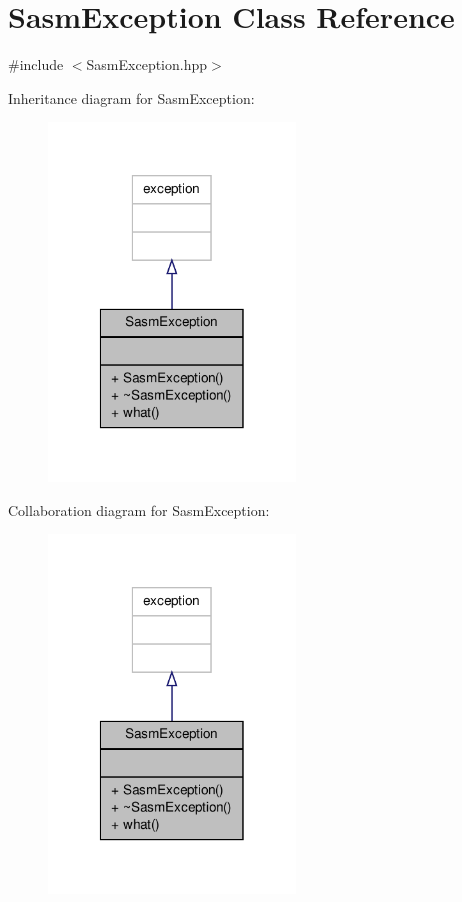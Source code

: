 \hypertarget{class_sasm_exception}{\section{Sasm\-Exception Class Reference}
\label{class_sasm_exception}
}


{\ttfamily \#include $<$Sasm\-Exception.\-hpp$>$}



Inheritance diagram for Sasm\-Exception\-:
\nopagebreak
\begin{figure}[H]
\begin{center}
\leavevmode
\includegraphics[width=186pt]{class_sasm_exception__inherit__graph}
\end{center}
\end{figure}


Collaboration diagram for Sasm\-Exception\-:
\nopagebreak
\begin{figure}[H]
\begin{center}
\leavevmode
\includegraphics[width=186pt]{class_sasm_exception__coll__graph}
\end{center}
\end{figure}
